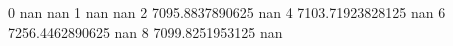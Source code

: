 0 nan nan
1 nan nan
2 7095.8837890625 nan
4 7103.71923828125 nan
6 7256.4462890625 nan
8 7099.8251953125 nan
